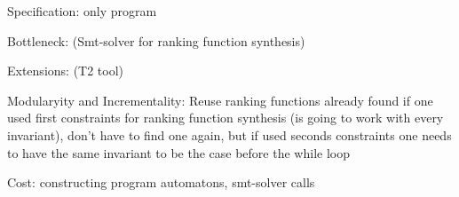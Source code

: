 \documentclass[a4paper]{article}
\begin{document}
\begin{minipage}[t]{0.16\linewidth}
\begin{betterlist}
{{\begin{betterlist}
					\item \alert{Specification:} only program
					\item \alert{Bottleneck:} (Smt-solver for ranking function synthesis)
					\item \alert{Extensions:} (T2 tool)
					\item \alert{Modularyity and Incrementality:} Reuse ranking functions already found if one used first constraints for ranking function synthesis (is going to work with every invariant), don't have to find one again, but if used seconds constraints one needs to have the same invariant to be the case before the while loop
					\item \alert{Cost:} constructing program automatons, smt-solver calls
				\end{betterlist}
			}}
	\end{betterlist}
\end{minipage}
\end{document}
